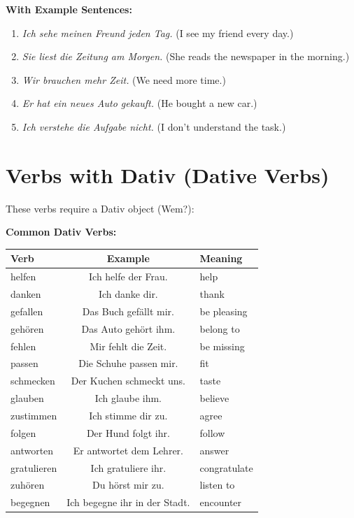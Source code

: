 \bigskip
\noindent\textbf{With Example Sentences:}

\begin{enumerate}
    \item \textit{Ich sehe meinen Freund jeden Tag.} (I see my friend every day.)
    \item \textit{Sie liest die Zeitung am Morgen.} (She reads the newspaper in the morning.)
    \item \textit{Wir brauchen mehr Zeit.} (We need more time.)
    \item \textit{Er hat ein neues Auto gekauft.} (He bought a new car.)
    \item \textit{Ich verstehe die Aufgabe nicht.} (I don't understand the task.)
\end{enumerate}

\section{Verbs with Dativ (Dative Verbs)}
\label{sec:DativVerben}

These verbs require a Dativ object (Wem?):

\bigskip
\noindent\textbf{Common Dativ Verbs:}

\begin{center}
\begin{tabular}{|l|c|l|}
\hline
Verb & Example & Meaning \\ \hline
helfen & Ich helfe der Frau. & help \\ \hline
danken & Ich danke dir. & thank \\ \hline
gefallen & Das Buch gefällt mir. & be pleasing \\ \hline
gehören & Das Auto gehört ihm. & belong to \\ \hline
fehlen & Mir fehlt die Zeit. & be missing \\ \hline
passen & Die Schuhe passen mir. & fit \\ \hline
schmecken & Der Kuchen schmeckt uns. & taste \\ \hline
glauben & Ich glaube ihm. & believe \\ \hline
zustimmen & Ich stimme dir zu. & agree \\ \hline
folgen & Der Hund folgt ihr. & follow \\ \hline
antworten & Er antwortet dem Lehrer. & answer \\ \hline
gratulieren & Ich gratuliere ihr. & congratulate \\ \hline
zuhören & Du hörst mir zu. & listen to \\ \hline
begegnen & Ich begegne ihr in der Stadt. & encounter \\ \hline
\end{tabular}
\end{center}

